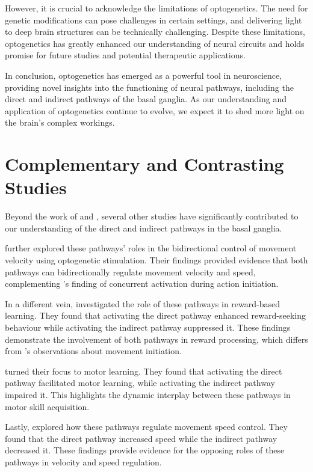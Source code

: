 \documentclass[10pt]{article}
\begin{document}
\begin{sloppypar}
  However, it is crucial to acknowledge the limitations of optogenetics. The need for genetic modifications can pose challenges in certain settings, and delivering light to deep brain structures can be technically challenging. Despite these limitations, optogenetics has greatly enhanced our understanding of neural circuits and holds promise for future studies and potential therapeutic applications.

  In conclusion, optogenetics has emerged as a powerful tool in neuroscience, providing novel insights into the functioning of neural pathways, including the direct and indirect pathways of the basal ganglia. As our understanding and application of optogenetics continue to evolve, we expect it to shed more light on the brain’s complex workings.

  \section{Complementary and Contrasting Studies}
  \label{sec:complementary-and-contrasting-studies}

  Beyond the work of \cite{cui_concurrent_2013} and \cite{kravitz_regulation_2010}, several other studies have significantly contributed to our understanding of the direct and indirect pathways in the basal ganglia.

  \cite{yttri_opponent_2016} further explored these pathways’ roles in the bidirectional control of movement velocity using optogenetic stimulation. Their findings provided evidence that both pathways can bidirectionally regulate movement velocity and speed, complementing \cite{cui_concurrent_2013}’s finding of concurrent activation during action initiation.

  In a different vein, \cite{guillaumin_experimental_2021} investigated the role of these pathways in reward-based learning. They found that activating the direct pathway enhanced reward-seeking behaviour while activating the indirect pathway suppressed it. These findings demonstrate the involvement of both pathways in reward processing, which differs from \cite{cui_concurrent_2013}’s observations about movement initiation.

  \cite{hilt_evidence_2016} turned their focus to motor learning. They found that activating the direct pathway facilitated motor learning, while activating the indirect pathway impaired it. This highlights the dynamic interplay between these pathways in motor skill acquisition.

  Lastly, \cite{wang_direct_2015} explored how these pathways regulate movement speed control. They found that the direct pathway increased speed while the indirect pathway decreased it. These findings provide evidence for the opposing roles of these pathways in velocity and speed regulation.


\end{sloppypar}
\end{document}

